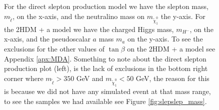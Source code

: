 \documentclass[12pt, a4paper]{book}
\begin{document}
\begin{figure}[!ht]
{      For the direct slepton production model we have the slepton mass, $m_{\tilde{\ell}}$, on the x-axis, and the neutralino mass on $m_{\tilde{\chi}_1^0}$ the y-axis. 
      For the 2HDM + a model we have the charged Higgs mass, $m_{H^-}$, on the x-axis, and the pseudoscalar $a$ mass $m_{a}$ on the y-axis. To see the exclusions for the other values of $\tan\beta$ on the 2HDM + a model see Appendix \ref{apx:MDA}. 
      Something to note about the direct slepton production plot (left), is the lack of exclusions in the bottom right corner where $m_{\tilde{\ell}}>350$ GeV and $m_{\tilde{\chi}_1^0}<50$ GeV, the reason for this is because we did not have any simulated event at that mass range, 
      to see the samples we had available see Figure \ref{fig:slepslep_mass}.
      }\label{fig:model_indep_excl}
\end{figure}
\end{document}
